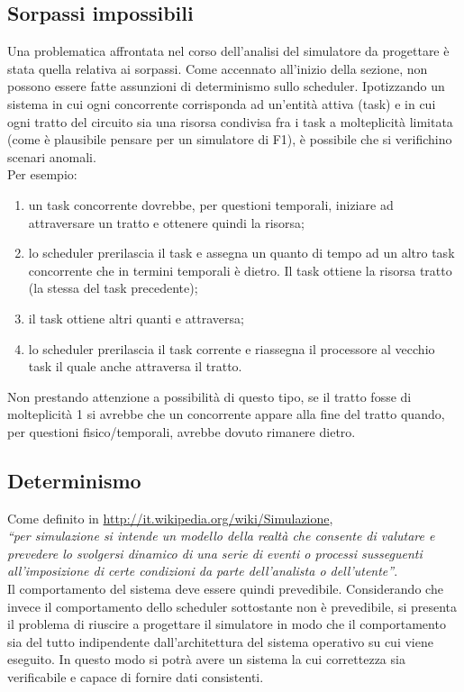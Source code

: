 \subsection{Sorpassi impossibili}
Una problematica affrontata nel corso dell'analisi del simulatore da progettare
è stata quella relativa ai sorpassi. Come accennato all'inizio
della sezione, non possono essere fatte assunzioni di determinismo sullo scheduler. 
Ipotizzando un sistema in cui ogni concorrente
corrisponda ad un'entità attiva (task) e in cui ogni tratto del circuito sia una risorsa condivisa fra i task a molteplicità
limitata (come è plausibile pensare per un simulatore di F1), è possibile che si verifichino scenari anomali.\\
Per esempio:
\begin{enumerate}
\item un task concorrente dovrebbe, per questioni temporali, iniziare ad attraversare un tratto e ottenere quindi la risorsa;
\item lo scheduler prerilascia il task e assegna un quanto di tempo ad un altro task concorrente che in termini temporali
è dietro. Il task ottiene la risorsa tratto (la stessa del task precedente);
\item il task ottiene altri quanti e attraversa;
\item lo scheduler prerilascia il task corrente e riassegna il processore al vecchio task il quale anche attraversa il tratto.
\end{enumerate}
Non prestando attenzione a possibilità di questo tipo, se il tratto fosse di molteplicità 1 si avrebbe che un concorrente 
appare alla fine del tratto quando, per questioni fisico/temporali, avrebbe dovuto rimanere dietro.
\subsection{Determinismo}
Come definito in \url{http://it.wikipedia.org/wiki/Simulazione}, \\

\emph{``per simulazione si intende un modello della realtà che consente di valutare e prevedere lo 
svolgersi dinamico di una serie di eventi o processi susseguenti all'imposizione di certe condizioni da parte dell'analista
o dell'utente''}.\\
Il comportamento del sistema deve essere quindi prevedibile. Considerando che invece il comportamento dello 
scheduler sottostante non è prevedibile, si presenta il problema di riuscire a progettare il simulatore in modo
che il comportamento sia del tutto indipendente dall'architettura del sistema operativo su cui viene eseguito. In questo
modo si potrà avere un sistema la cui correttezza sia verificabile e capace di fornire dati consistenti.
